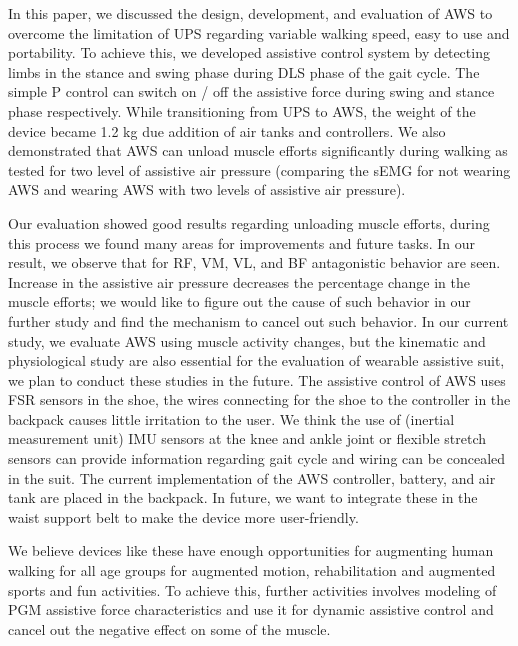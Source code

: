 \documentclass[letterpaper, 10 pt, conference]{ieeeconf}  %
\begin{document}
In this paper, we discussed the design, development, and evaluation of AWS to overcome the limitation of UPS regarding variable walking speed, easy to use and portability. To achieve this, we developed assistive control system by detecting limbs in the stance and swing phase during DLS phase of the gait cycle. The simple P control can switch on / off the assistive force during swing and stance phase respectively. While transitioning from UPS to AWS, the weight of the device became 1.2 kg due addition of air tanks and controllers. We also demonstrated that AWS can unload muscle efforts significantly during walking as tested for two level of assistive air pressure (comparing the sEMG for not wearing AWS and wearing AWS with two levels of assistive air pressure). 

Our evaluation showed good results regarding unloading muscle efforts, during this process we found many areas for improvements and future tasks. In our result, we observe that for RF, VM, VL, and BF antagonistic behavior are seen. Increase in the assistive air pressure decreases the percentage change in the muscle efforts; we would like to figure out the cause of such behavior in our further study and find the mechanism to cancel out such behavior. In our current study, we evaluate AWS using muscle activity changes, but the kinematic and physiological study are also essential for the evaluation of wearable assistive suit, we plan to conduct these studies in the future.  The assistive control of AWS uses FSR sensors in the shoe, the wires connecting for the shoe to the controller in the backpack causes little irritation to the user. We think the use of (inertial measurement unit) IMU sensors at the knee and ankle joint or flexible stretch sensors can provide information regarding gait cycle and wiring can be concealed in the suit. The current implementation of the AWS controller, battery, and air tank are placed in the backpack. In future, we want to integrate these in the waist support belt to make the device more user-friendly. 

We believe devices like these have enough opportunities for augmenting human walking for all age groups for augmented motion, rehabilitation and augmented sports and fun activities. To achieve this, further activities involves modeling of PGM assistive force characteristics and use it for dynamic assistive control and cancel out the negative effect on some of the muscle. 


\addtolength{\textheight}{-12cm}   %
\end{document}
